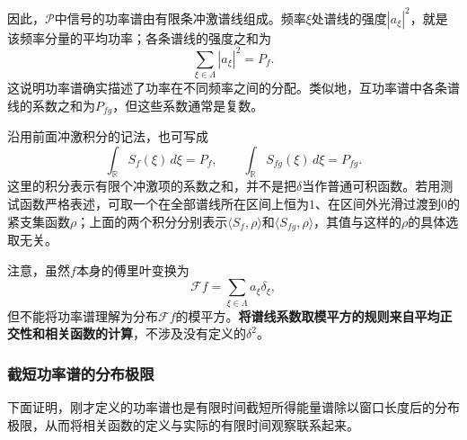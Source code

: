 因此，$\mathcal{P}$中信号的功率谱由有限条冲激谱线组成。频率$\xi$处谱线的强度$|a_\xi|^2$，就是该频率分量的平均功率；各条谱线的强度之和为
$$
    \sum_{\xi\in\Lambda}|a_\xi|^2=P_f.
$$
这说明功率谱确实描述了功率在不同频率之间的分配。类似地，互功率谱中各条谱线的系数之和为$P_{fg}$，但这些系数通常是复数。

沿用前面冲激积分的记法，也可写成
$$
    \int_{\mathbb{R}}S_f(\xi)\,d\xi=P_f,
    \qquad
    \int_{\mathbb{R}}S_{fg}(\xi)\,d\xi=P_{fg}.
$$
这里的积分表示有限个冲激项的系数之和，并不是把$\delta$当作普通可积函数。若用测试函数严格表述，可取一个在全部谱线所在区间上恒为$1$、在区间外光滑过渡到$0$的紧支集函数$\rho$；上面的两个积分分别表示$\langle S_f,\rho\rangle$和$\langle S_{fg},\rho\rangle$，其值与这样的$\rho$的具体选取无关。

注意，虽然$f$本身的傅里叶变换为
$$
    \mathcal{F}f=\sum_{\xi\in\Lambda}a_\xi\delta_\xi,
$$
但不能将功率谱理解为分布$\mathcal{F}f$的模平方。\textbf{将谱线系数取模平方的规则来自平均正交性和相关函数的计算}，不涉及没有定义的$\delta^2$。

\subsubsection{截短功率谱的分布极限}

下面证明，刚才定义的功率谱也是有限时间截短所得能量谱除以窗口长度后的分布极限，从而将相关函数的定义与实际的有限时间观察联系起来。

